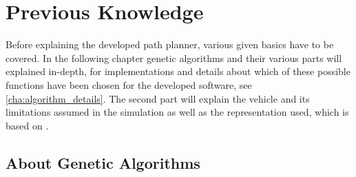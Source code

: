 \chapter{Previous Knowledge}
\label{cha:previous_knowledge}

Before explaining the developed path planner, various given basics have to be covered. In the following chapter genetic algorithms and their various parts will explained in-depth, for implementations and details about which of these possible functions have been chosen for the developed software, see \ref{cha:algorithm_details}. The second part will explain the vehicle and its limitations assumed in the simulation as well as the representation used, which is based on \cite{12}.

\section{About Genetic Algorithms}
\label{sec:previous_knowledge_ga}

